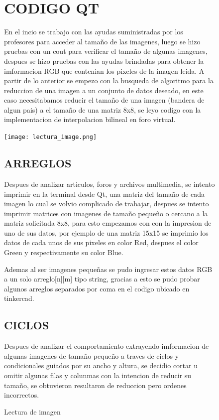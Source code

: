 \documentclass{article}
\begin{document}
\begin{figure}   
\section {CODIGO QT}
En el incio se trabajo con las ayudas suministradas por los profesores para acceder al tamaño de las imagenes, luego se hizo pruebas con un cout para verificar el tamaño de algunas imagenes, despues se hizo pruebas con las ayudas brindadas para obtener la imformacion RGB que contenian los pixeles de la imagen leida.
A partir de lo anterior se empezo con la busqueda de algoritmo para la reduccion de una imagen a un conjunto de datos deseado, en este caso necesitabamos reducir el tamaño de una imagen (bandera de algun pais) a el tamaño de una matriz 8x8, se leyo codigo con la implementacion de interpolacion bilineal\cite{articulo_stackoverflow} en foro virtual.

    \texttt{[image: lectura\_image.png]}
    \centering
    \caption{Lectura de imagen}
    \label{fig:lectura_image}

\subsection{ARREGLOS}
Despues de analizar articulos, foros y archivos multimedia\cite{Subsampling}, se intento imprimir en la terminal desde Qt, una matriz del tamaño de cada imagen lo cual se volvio complicado de trabajar, despues se intento imprimir matrices con imagenes de tamaño pequeño o cercano a la matriz solicitada 8x8, para esto empezamos con con la impresion de uno de sus datos, por ejemplo de una matriz 15x15 se imprimio los datos de cada unos de sus pixeles en color Red, despues el color Green y respectivamente su color Blue.

Ademas al ser imagenes pequeñas se pudo ingresar estos datos RGB a un solo arreglo[n][m] tipo string, gracias a esto se pudo probar algunos arreglos separados por coma en el codigo ubicado en tinkercad.

\subsection{CICLOS}
Despues de analizar el comportamiento extrayendo imformacion de algunas imagenes de tamaño pequeño a traves de ciclos y condicionales guiados por su ancho y altura, se decidio cortar u omitir algunas filas y colunmas con la intencion de reducir su tamaño, se obtuvieron resultaron de reduccion pero ordenes incorrectos.
\end{figure}
\end{document}
